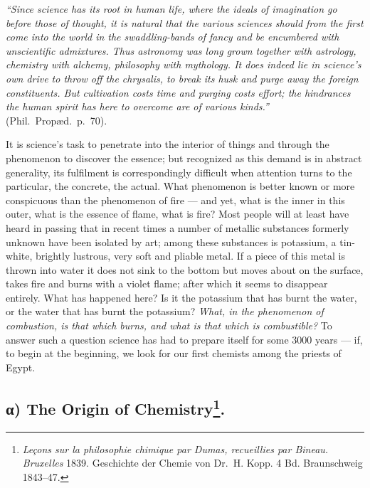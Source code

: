 \documentclass[12pt,a4paper]{book}
\begin{document}

\emph{``Since science has its root in human life, where the ideals of
imagination go before those of thought, it is natural that the various sciences
should from the first come into the world in the swaddling-bands of fancy and
be encumbered with unscientific admixtures. Thus astronomy was long grown
together with astrology, chemistry with alchemy, philosophy with mythology. It
does indeed lie in science's own drive to throw off the chrysalis, to break its
husk and purge away the foreign constituents. But cultivation costs time and
purging costs effort; the hindrances the human spirit has here to overcome are
of various kinds.''} (Phil.\ Propæd.\ p.~70).

It is science's task to penetrate into the interior of things and through the
phenomenon to discover the essence; but recognized as this demand is in
abstract generality, its fulfilment is correspondingly difficult when attention
turns to the particular, the concrete, the actual. What phenomenon is better
known or more conspicuous than the phenomenon of fire --- and yet, what is the
inner in this outer, what is the essence of flame, what is fire? Most people
will at least have heard in passing that in recent times a number of metallic
substances formerly unknown have been isolated by art; among these substances
is potassium, a tin-white, brightly lustrous, very
\setcounter{footnote}{0}
soft and pliable metal. If a piece of this metal is thrown into water it does
not sink to the bottom but moves about on the surface, takes fire and burns
with a violet flame; after which it seems to disappear entirely. What has
happened here? Is it the potassium that has burnt the water, or the water that
has burnt the potassium? \emph{What, in the phenomenon of combustion, is that
which burns, and what is that which is combustible?} To answer such a question
science has had to prepare itself for some 3000 years --- if, to begin at the
beginning, we look for our first chemists among the priests of Egypt.

\subsection*{α) The Origin of Chemistry\protect\footnote{\textit{Leçons
sur la philosophie chimique par Dumas, recueillies par
Bineau.} \textit{Bruxelles} 1839. Geschichte der Chemie von
Dr.~H. Kopp. 4 Bd. Braunschweig 1843--47.}.}
\end{document}
